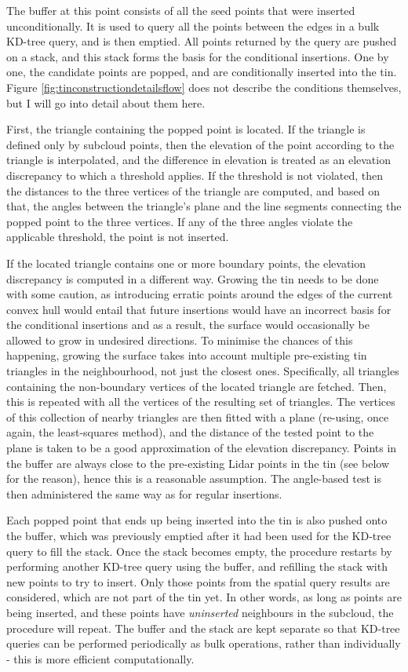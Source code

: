 The buffer at this point consists of all the seed points that were inserted unconditionally. It is used to query all the points between the edges in a bulk KD-tree query, and is then emptied. All points returned by the query are pushed on a stack, and this stack forms the basis for the conditional insertions. One by one, the candidate points are popped, and are conditionally inserted into the \ac{tin}. Figure \ref{fig:tinconstructiondetailsflow} does not describe the conditions themselves, but I will go into detail about them here.

First, the triangle containing the popped point is located. If the triangle is defined only by subcloud points, then the elevation of the point according to the triangle is interpolated, and the difference in elevation is treated as an elevation discrepancy to which a threshold applies. If the threshold is not violated, then the distances to the three vertices of the triangle are computed, and based on that, the angles between the triangle's plane and the line segments connecting the popped point to the three vertices. If any of the three angles violate the applicable threshold, the point is not inserted.

If the located triangle contains one or more boundary points, the elevation discrepancy is computed in a different way. Growing the \ac{tin} needs to be done with some caution, as introducing erratic points around the edges of the current convex hull would entail that future insertions would have an incorrect basis for the conditional insertions and as a result, the surface would occasionally be allowed to grow in undesired directions. To minimise the chances of this happening, growing the surface takes into account multiple pre-existing \ac{tin} triangles in the neighbourhood, not just the closest ones. Specifically, all triangles containing the non-boundary vertices of the located triangle are fetched. Then, this is repeated with all the vertices of the resulting set of triangles. The vertices of this collection of nearby triangles are then fitted with a plane (re-using, once again, the least-squares method), and the distance of the tested point to the plane is taken to be a good approximation of the elevation discrepancy. Points in the buffer are always close to the pre-existing Lidar points in the \ac{tin} (see below for the reason), hence this is a reasonable assumption. The angle-based test is then administered the same way as for regular insertions.

Each popped point that ends up being inserted into the \ac{tin} is also pushed onto the buffer, which was previously emptied after it had been used for the KD-tree query to fill the stack. Once the stack becomes empty, the procedure restarts by performing another KD-tree query using the buffer, and refilling the stack with new points to try to insert. Only those points from the spatial query results are considered, which are not part of the \ac{tin} yet. In other words, as long as points are being inserted, and these points have \textit{uninserted} neighbours in the subcloud, the procedure will repeat. The buffer and the stack are kept separate so that KD-tree queries can be performed periodically as bulk operations, rather than individually - this is more efficient computationally.

